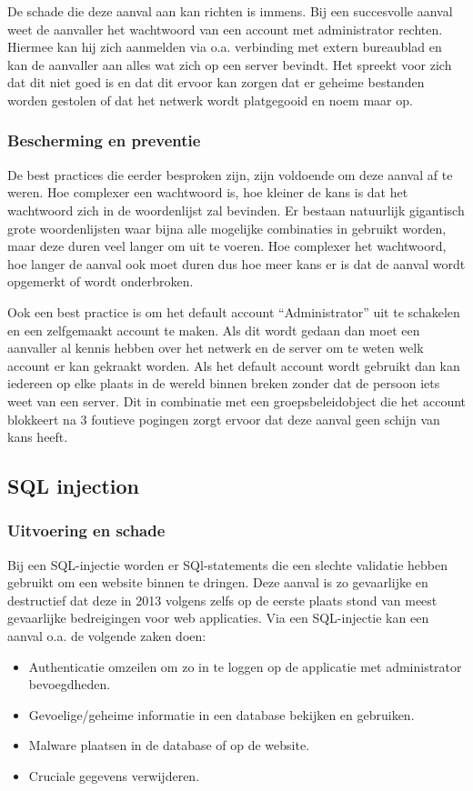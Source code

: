 \documentclass[pdftex,a4paper,12pt]{report}
\begin{document}
De schade die deze aanval aan kan richten is immens. Bij een succesvolle aanval weet de aanvaller het wachtwoord van een account met administrator rechten. Hiermee kan hij zich aanmelden via o.a. verbinding met extern bureaublad en kan de aanvaller aan alles wat zich op een server bevindt. Het spreekt voor zich dat dit niet goed is en dat dit ervoor kan zorgen dat er geheime bestanden worden gestolen of dat het netwerk wordt platgegooid en noem maar op.

\subsubsection{Bescherming en preventie}
De best practices die eerder besproken zijn, zijn voldoende om deze aanval af te weren. Hoe complexer een wachtwoord is, hoe kleiner de kans is dat het wachtwoord zich in de woordenlijst zal bevinden. Er bestaan natuurlijk gigantisch grote woordenlijsten waar bijna alle mogelijke combinaties in gebruikt worden, maar deze duren veel langer om uit te voeren. Hoe complexer het wachtwoord, hoe langer de aanval ook moet duren dus hoe meer kans er is dat de aanval wordt opgemerkt of wordt onderbroken. \newline 

Ook een best practice is om het default account "`Administrator"' uit te schakelen en een zelfgemaakt account te maken. Als dit wordt gedaan dan moet een aanvaller al kennis hebben over het netwerk en de server om te weten welk account er kan gekraakt worden. Als het default account wordt gebruikt dan kan iedereen op elke plaats in de wereld binnen breken zonder dat de persoon iets weet van een server. Dit in combinatie met een groepsbeleidobject die het account blokkeert na 3 foutieve pogingen zorgt ervoor dat deze aanval geen schijn van kans heeft.

\subsection{SQL injection}
\subsubsection{Uitvoering en schade}
Bij een SQL-injectie worden er SQl-statements die een slechte validatie hebben gebruikt om een website binnen te dringen. Deze aanval is zo gevaarlijke en destructief dat deze in 2013 volgens \cite{Cisco2013} zelfs op de eerste plaats stond van meest gevaarlijke bedreigingen voor web applicaties. Via een SQL-injectie kan een aanval o.a. de volgende zaken doen:
\begin{itemize}
	\item Authenticatie omzeilen om zo in te loggen op de applicatie met administrator bevoegdheden.
	\item Gevoelige/geheime informatie in een database bekijken en gebruiken.
	\item Malware plaatsen in de database of op de website.
	\item Cruciale gegevens verwijderen.
\end{itemize}
\end{document}
